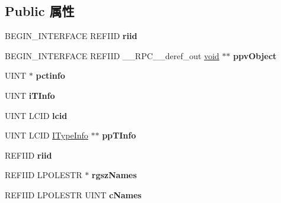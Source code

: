 \subsection*{Public 属性}
\begin{DoxyCompactItemize}
\item 
\mbox{\label{struct_i_ms_tsc_ax_vtbl_a52f9d5cf8a20edb21980cdb12ed524fa}} 
B\+E\+G\+I\+N\+\_\+\+I\+N\+T\+E\+R\+F\+A\+CE R\+E\+F\+I\+ID {\bfseries riid}
\item 
\mbox{\label{struct_i_ms_tsc_ax_vtbl_aa52cf45579ad155b2979e7daab399ff4}} 
B\+E\+G\+I\+N\+\_\+\+I\+N\+T\+E\+R\+F\+A\+CE R\+E\+F\+I\+ID \+\_\+\+\_\+\+R\+P\+C\+\_\+\+\_\+deref\+\_\+out \hyperlink{interfacevoid}{void} $\ast$$\ast$ {\bfseries ppv\+Object}
\item 
\mbox{\label{struct_i_ms_tsc_ax_vtbl_aa2f0f4865f788b374de10cad62f69e46}} 
U\+I\+NT $\ast$ {\bfseries pctinfo}
\item 
\mbox{\label{struct_i_ms_tsc_ax_vtbl_a4710bd045e460b652f68a4f5b07a8c7f}} 
U\+I\+NT {\bfseries i\+T\+Info}
\item 
\mbox{\label{struct_i_ms_tsc_ax_vtbl_a2e93db505ed3f94e3f0de33f9214a617}} 
U\+I\+NT L\+C\+ID {\bfseries lcid}
\item 
\mbox{\label{struct_i_ms_tsc_ax_vtbl_a377c87cba6cd8d811b6c693cf039c59f}} 
U\+I\+NT L\+C\+ID \hyperlink{interface_i_type_info}{I\+Type\+Info} $\ast$$\ast$ {\bfseries pp\+T\+Info}
\item 
\mbox{\label{struct_i_ms_tsc_ax_vtbl_a486d69a94da1f7d882a9e7d5620af5e1}} 
R\+E\+F\+I\+ID {\bfseries riid}
\item 
\mbox{\label{struct_i_ms_tsc_ax_vtbl_ae6a9426c51f6e479b460744887844a2a}} 
R\+E\+F\+I\+ID L\+P\+O\+L\+E\+S\+TR $\ast$ {\bfseries rgsz\+Names}
\item 
\mbox{\label{struct_i_ms_tsc_ax_vtbl_a06943e9ace212ced0ac9ec5070df66ce}} 
R\+E\+F\+I\+ID L\+P\+O\+L\+E\+S\+TR U\+I\+NT {\bfseries c\+Names}

\end{DoxyCompactItemize}
